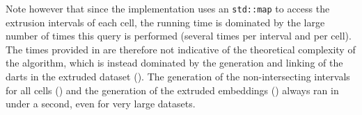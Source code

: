 Note however that since the implementation uses an \texttt{std::map} to access the extrusion intervals of each cell, the running time is dominated by the large number of times this query is performed (several times per interval and per cell).
The times provided in  are therefore not indicative of the theoretical complexity of the algorithm, which is instead dominated by the generation and linking of the darts in the extruded dataset ().
The generation of the non-intersecting intervals for all cells () and the generation of the extruded embeddings () always ran in under a second, even for very large datasets.

